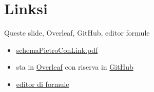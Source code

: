 \documentclass[9pt]{beamer}
\begin{document}
\section{Linksi}

\begin{frame}{Queste slide, Overleaf, GitHub, editor formule}

\begin{itemize}

\item
\href{https://terna.to.it/ejmmp/deposito/schemaPietroConLink.pdf}{schemaPietroConLink.pdf}

\item
sta in \href{https://it.overleaf.com/4892961924fddsgrqnbwhh}{Overleaf} con riserva in \href{https://github.com/terna/ejmmpSchemaPietro}{GitHub}

\item
\href{https://editor.codecogs.com}{editor di formule}

\end{itemize}


\end{frame}
\end{document}
